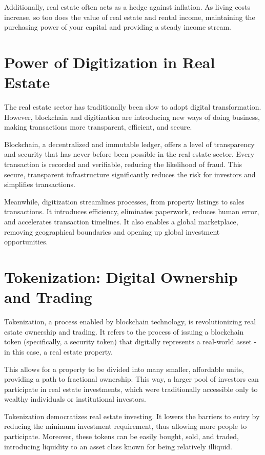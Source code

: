 \documentclass[11pt]{article}
\begin{document}
Additionally, real estate often acts as a hedge against inflation. As living costs increase, so too does the value of real estate and rental income, maintaining the purchasing power of your capital and providing a steady income stream.


\section{Power of Digitization in Real Estate}

The real estate sector has traditionally been slow to adopt digital transformation. However, blockchain and digitization are introducing new ways of doing business, making transactions more transparent, efficient, and secure.


Blockchain, a decentralized and immutable ledger, offers a level of transparency and security that has never before been possible in the real estate sector. Every transaction is recorded and verifiable, reducing the likelihood of fraud. This secure, transparent infrastructure significantly reduces the risk for investors and simplifies transactions.


Meanwhile, digitization streamlines processes, from property listings to sales transactions. It introduces efficiency, eliminates paperwork, reduces human error, and accelerates transaction timelines. It also enables a global marketplace, removing geographical boundaries and opening up global investment opportunities.


\section{Tokenization: Digital Ownership and Trading}

Tokenization, a process enabled by blockchain technology, is revolutionizing real estate ownership and trading. It refers to the process of issuing a blockchain token (specifically, a security token) that digitally represents a real-world asset - in this case, a real estate property.


This allows for a property to be divided into many smaller, affordable units, providing a path to fractional ownership. This way, a larger pool of investors can participate in real estate investments, which were traditionally accessible only to wealthy individuals or institutional investors.


Tokenization democratizes real estate investing. It lowers the barriers to entry by reducing the minimum investment requirement, thus allowing more people to participate. Moreover, these tokens can be easily bought, sold, and traded, introducing liquidity to an asset class known for being relatively illiquid.
\end{document}
